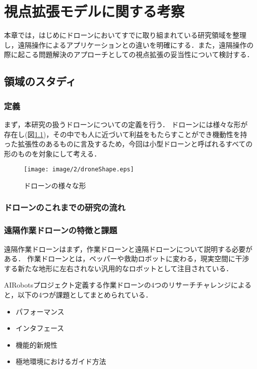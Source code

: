 \chapter{視点拡張モデルに関する考察} 
本章では，はじめにドローンにおいてすでに取り組まれている研究領域を整理し，遠隔操作によるアプリケーションとの違いを明確にする．また，遠隔操作の際に起こる問題解決のアプローチとしての視点拡張の妥当性について検討する．

\section{領域のスタディ}
\subsection{定義}
まず，本研究の扱うドローンについての定義を行う．
ドローンには様々な形が存在し(図\ref{droneShape})，その中でも人に近づいて利益をもたらすことができ機動性を持った拡張性のあるものに言及するため，今回は小型ドローンと呼ばれるすべての形のものを対象にして考える．

\begin{figure}[htbp]
 \begin{center}
  \texttt{[image: image/2/droneShape.eps]}
 \end{center}
 \caption{ドローンの様々な形}
 \label{droneShape}
\end{figure} 

\subsection{ドローンのこれまでの研究の流れ}
\subsection{遠隔作業ドローンの特徴と課題}
遠隔作業ドローンはまず，作業ドローンと遠隔ドローンについて説明する必要がある．
作業ドローンとは，ペッパーや救助ロボットに変わる，現実空間に干渉する新たな地形に左右されない汎用的なロボットとして注目されている．

AIRobotsプロジェクト定義する作業ドローンの4つのリサーチチャレンジによると\cite{marconi2012aerial}，以下の4つが課題としてまとめられている．

\begin{itemize}
 \item パフォーマンス
 \item インタフェース
 \item 機能的新規性
 \item 極地環境におけるガイド方法
\end{itemize}


